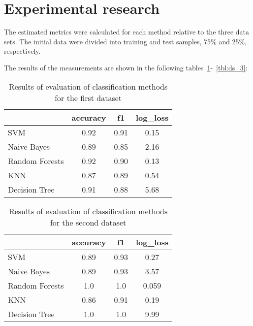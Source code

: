 \newpage
\section{Experimental research}\label{sec:experiment}

The estimated metrics were calculated for each method relative to the three data sets.
The initial data were divided into training and test samples, 75\% and 25\%, respectively.

The results of the measurements are shown in the following tables~\ref{tbl:ds_1}-~\ref{tbl:ds_3}:

\begin{table}[ht]
\centering
\caption{Results of evaluation of classification methods for the first dataset}
\begin{tabular}{l|ccc|}
\cline{2-4}
                                     & \multicolumn{1}{c|}{accuracy} & \multicolumn{1}{c|}{f1} & log\_loss \\ \hline
\multicolumn{1}{|l|}{SVM}            & 0.92                          & 0.91                    & 0.15      \\ \hline
\multicolumn{1}{|l|}{Naive Bayes}    & 0.89                          & 0.85                    & 2.16      \\ \hline
\multicolumn{1}{|l|}{Random Forests} & 0.92                          & 0.90                    & 0.13      \\ \hline
\multicolumn{1}{|l|}{KNN}            & 0.87                          & 0.89                    & 0.54      \\ \hline
\multicolumn{1}{|l|}{Decision Tree}  & 0.91                          & 0.88                    & 5.68      \\ \hline
\end{tabular}
\label{tbl:ds_1}
\end{table}

\begin{table}[ht]
\centering
\caption{Results of evaluation of classification methods for the second dataset}
\begin{tabular}{l|ccc|}
\cline{2-4}
                                     & \multicolumn{1}{c|}{accuracy} & \multicolumn{1}{c|}{f1} & log\_loss \\ \hline
\multicolumn{1}{|l|}{SVM}            & 0.89                          & 0.93                    & 0.27      \\ \hline
\multicolumn{1}{|l|}{Naive Bayes}    & 0.89                          & 0.93                    & 3.57      \\ \hline
\multicolumn{1}{|l|}{Random Forests} & 1.0                           & 1.0                     & 0.059     \\ \hline
\multicolumn{1}{|l|}{KNN}            & 0.86                          & 0.91                    & 0.19      \\ \hline
\multicolumn{1}{|l|}{Decision Tree}  & 1.0                           & 1.0                     & 9.99      \\ \hline
\end{tabular}
\label{tbl:ds_2}
\end{table}

